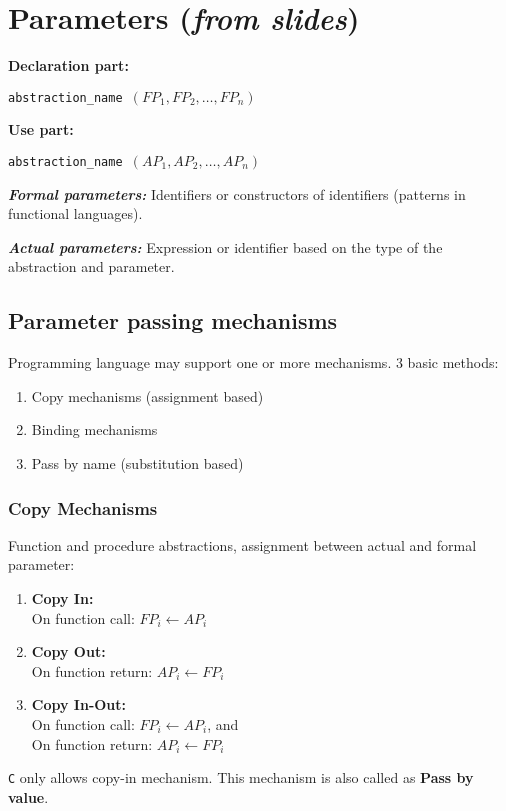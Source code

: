 \section{Parameters (\textit{from slides})}

\textbf{Declaration part:}

\texttt{abstraction\_name $(FP_1, FP_2, \ldots, FP_n)$}

\noindent \textbf{Use part:}

\texttt{abstraction\_name $(AP_1, AP_2, \ldots, AP_n)$}

\noindent \textit{\textbf{Formal parameters:}} Identifiers or constructors of identifiers (patterns in functional languages).

\noindent \textit{\textbf{Actual parameters:}} Expression or identifier based on the type of the abstraction and parameter.

\subsection{Parameter passing mechanisms}

Programming language may support one or more mechanisms. 3 basic methods:
\begin{enumerate}
 \item Copy mechanisms (assignment based)
 \item Binding mechanisms 
 \item Pass by name (substitution based)
\end{enumerate}

\subsubsection{Copy Mechanisms}

Function and procedure abstractions, assignment between actual and formal parameter:
\begin{enumerate}
 \item \textbf{Copy In:} \\
	On function call: $FP_i \leftarrow AP_i$
 \item \textbf{Copy Out:} \\
	On function return: $AP_i \leftarrow FP_i$
 \item \textbf{Copy In-Out:} \\
	On function call: $FP_i \leftarrow AP_i$, and\\
	On function return: $AP_i \leftarrow FP_i$
\end{enumerate}
\texttt{C} only allows copy-in mechanism. This mechanism is also called as \textbf{Pass by value}.


